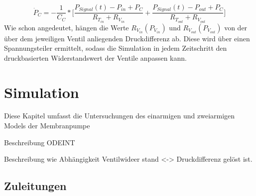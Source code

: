\documentclass[fontsize=12pt, a4paper]{scrartcl}
\let\stdsection\section 	%
\renewcommand\section{\newpage\stdsection}
\begin{document}
\begin{equation}
	\dot{P}_{C} = - \frac{1}{C_{C}} * \biggl[\frac{P_{Signal}(t)-P_{in}+P_{C}}{R_{T_{in}}+R_{V_{in}}} + \frac{P_{Signal}(t)-P_{out}+P_{C}}{R_{T_{out}}+R_{V_{out}}}\biggr]
\end{equation}
Wie schon angedeutet, hängen die Werte $R_V_{in}(P_V_{in})$ und $R_V_{out}(P_V_{out})$ von der über dem jeweiligen Ventil anliegenden Druckdifferenz ab. Diese wird über einen Spannungsteiler ermittelt, sodass die Simulation in jedem Zeitschritt den druckbasierten Widerstandswert der Ventile anpassen kann.

\section{Simulation}

Diese Kapitel umfasst die Untersuchungen des einarmigen und zweiarmigen Models der Membranpumpe

Beschreibung ODEINT

Beschreibung wie Abhängigkeit Ventilwideer stand <-> Druckdifferenz gelöst ist.

\subsection{Zuleitungen}
\end{document}
